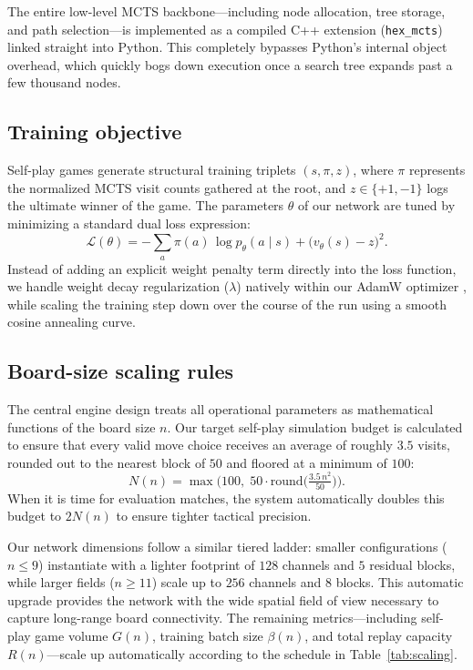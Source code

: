 \documentclass[conference]{IEEEtran}
\begin{document}
The entire low-level MCTS backbone---including node allocation, tree storage, and path selection---is implemented as a compiled C++ extension (\texttt{hex\_mcts}) linked straight into Python. This completely bypasses Python's internal object overhead, which quickly bogs down execution once a search tree expands past a few thousand nodes.

\subsection{Training objective}
Self-play games generate structural training triplets $(s,\pi,z)$, where $\pi$ represents the normalized MCTS visit counts gathered at the root, and $z\in\{+1,-1\}$ logs the ultimate winner of the game. The parameters $\theta$ of our network are tuned by minimizing a standard dual loss expression:
\begin{equation}
  \mathcal{L}(\theta) = -\sum_a \pi(a)\,\log p_\theta(a\mid s) + \big(v_\theta(s) - z\big)^2.
  \label{eq:loss}
\end{equation}
Instead of adding an explicit weight penalty term directly into the loss function, we handle weight decay regularization ($\lambda$) natively within our AdamW optimizer \cite{loshchilov2019decoupled}, while scaling the training step down over the course of the run using a smooth cosine annealing curve.

\subsection{Board-size scaling rules}
\label{sec:scaling}
The central engine design treats all operational parameters as mathematical functions of the board size $n$. Our target self-play simulation budget is calculated to ensure that every valid move choice receives an average of roughly $3.5$ visits, rounded out to the nearest block of $50$ and floored at a minimum of $100$:
\begin{equation}
  N(n) = \max\!\Big(100,\; 50\cdot\mathrm{round}\!\big(\tfrac{3.5\,n^2}{50}\big)\Big).
  \label{eq:sims}
\end{equation}
When it is time for evaluation matches, the system automatically doubles this budget to $2N(n)$ to ensure tighter tactical precision.

Our network dimensions follow a similar tiered ladder: smaller configurations ($n\le 9$) instantiate with a lighter footprint of $128$ channels and $5$ residual blocks, while larger fields ($n\ge 11$) scale up to $256$ channels and $8$ blocks. This automatic upgrade provides the network with the wide spatial field of view necessary to capture long-range board connectivity. The remaining metrics---including self-play game volume $G(n)$, training batch size $\beta(n)$, and total replay capacity $R(n)$---scale up automatically according to the schedule in Table~\ref{tab:scaling}.
\end{document}
